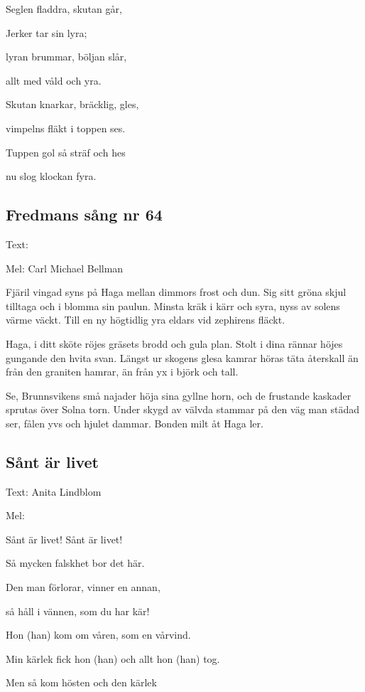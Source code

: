 Seglen fladdra, skutan går,

Jerker tar sin lyra;

lyran brummar, böljan slår,

allt med våld och yra.

Skutan knarkar, bräcklig, gles,

vimpelns fläkt i toppen ses.

Tuppen gol så sträf och hes

nu slog klockan fyra. 

\subsection{\textbf{Fredmans sång nr 64 }}

Text: 

Mel: Carl Michael Bellman\bigskip

Fjäril vingad syns på Haga
mellan dimmors frost och dun.
Sig sitt gröna skjul tilltaga
och i blomma sin paulun.
Minsta kräk i kärr och syra,
nyss av solens värme väckt.
Till en ny högtidlig yra
eldars vid zephirens fläckt.\bigskip

Haga, i ditt sköte röjes
gräsets brodd och gula plan.
Stolt i dina rännar höjes
gungande den hvita svan.
Längst ur skogens glesa kamrar
höras täta återskall
än från den graniten hamrar,
än från yx i björk och tall.\bigskip

Se, Brunnsvikens små najader
höja sina gyllne horn,
och de frustande kaskader
sprutas över Solna torn.
Under skygd av välvda stammar
på den väg man städad ser,
fålen yvs och hjulet dammar.
Bonden milt åt Haga ler. 

\subsection{\textbf{Sånt är livet}}

Text: Anita Lindblom

Mel: \bigskip

Sånt är livet! Sånt är livet!

Så mycken falskhet bor det här.

Den man förlorar, vinner en annan,

så håll i vännen, som du har kär!\bigskip

Hon (han) kom om våren, som en vårvind.

Min kärlek fick hon (han) och allt hon (han) tog.

Men så kom hösten och den kärlek

